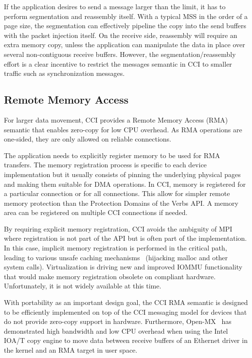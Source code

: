 If the application desires to send a message larger than the limit, it has 
to perform segmentation and reassembly itself. With a typical MSS in the order 
of a page size, the segmentation can effectively pipeline the copy into the 
send buffers with the packet injection itself. On the receive side, 
reassembly will require an extra memory copy, unless the application can 
manipulate the data in place over several non-contiguous receive buffers.
However, the segmentation/reassembly effort is a clear incentive 
to restrict the messages semantic in CCI to smaller traffic 
such as synchronization messages.

\subsection{Remote Memory Access}
For larger data movement, CCI provides a Remote Memory Access (RMA) semantic 
that enables zero-copy for low CPU overhead. As RMA operations are one-sided, 
they are only allowed on reliable connections. 

The application needs to explicitly register memory to be used for RMA 
transfers. The memory registration process is specific to each device 
implementation but it usually consists of pinning the underlying physical 
pages and making them suitable for DMA operations. In CCI, memory is registered 
for a particular connection or for all connections. This allow for simpler 
remote memory protection than the Protection Domains of the Verbs API. A 
memory area can be registered on multiple CCI connections if needed.

By requiring explicit memory registration, CCI avoids the ambiguity of MPI 
where registration is not part of the API but is often part of the implementation. 
In this case, implicit memory registration is performed in the critical 
path, leading to various unsafe caching mechanisms~\cite{regcache} 
(hijacking malloc and other system calls). 
Virtualization is driving new and improved IOMMU functionality 
that would make memory registration obsolete on compliant hardware. 
Unfortunately, it is not widely available at this time.

With portability as an important design goal, the CCI RMA semantic is 
designed to be efficiently implemented on top of the CCI messaging model 
for devices that do not provide zero-copy support in hardware. 
Furthermore, Open-MX~\cite{Gog11ParCo} has demonstrated high bandwidth and low CPU 
overhead when using the Intel IOA/T copy engine to move data between receive 
buffers of an Ethernet driver in the kernel and an RMA target in user 
space.

